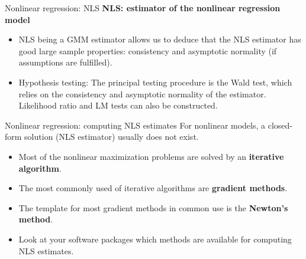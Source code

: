 \documentclass{beamer}
\begin{document}
\begin{frame}{Nonlinear regression: NLS}
\textbf{NLS: estimator of the nonlinear regression model}\\
\bigskip
\begin{itemize}
\item NLS being a GMM estimator allows us to deduce that the NLS estimator has good large sample properties: consistency and asymptotic normality (if assumptions are fulfilled).
\medskip
\item Hypothesis testing: The principal testing procedure is the Wald test, which relies on the consistency and asymptotic normality of the estimator. Likelihood ratio and LM tests can also be constructed.
\end{itemize}
\end{frame}

\begin{frame}{Nonlinear regression: computing NLS estimates}
For nonlinear models, a closed-form solution (NLS estimator) usually does not exist.\\
\medskip
\begin{itemize}
\item Most of the nonlinear maximization problems are solved by an \textbf{iterative algorithm}.
\item The most commonly used of iterative algorithms are \textbf{gradient methods}.
\item The template for most gradient methods in common use is the \textbf{Newton's method}.
\item Look at your software packages which methods are available for computing NLS estimates.
\end{itemize}
\end{frame}
\end{document}
